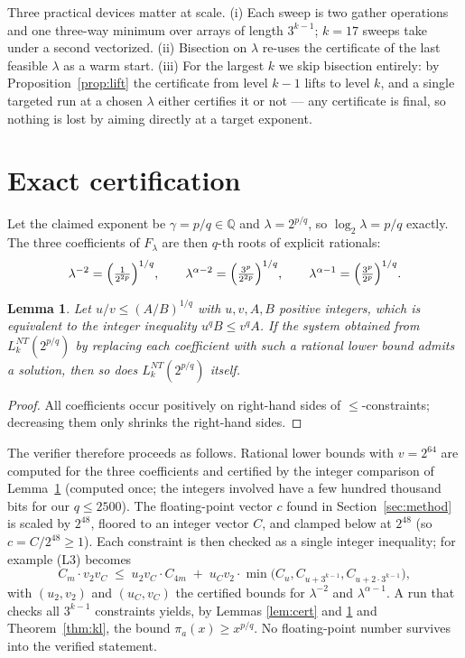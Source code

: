 \documentclass[11pt]{article}
\newtheorem{lemma}[theorem]{Lemma}
\newcommand{\Q}{\mathbb{Q}}
\begin{document}
Three practical devices matter at scale. (i) Each sweep is two gather
operations and one three-way minimum over arrays of length $3^{k-1}$;
$k = 17$ sweeps take under a second vectorized. (ii) Bisection on
$\lambda$ re-uses the certificate of the last feasible $\lambda$ as a
warm start. (iii) For the largest $k$ we skip bisection entirely: by
Proposition~\ref{prop:lift} the certificate from level $k-1$ lifts to
level $k$, and a single targeted run at a chosen $\lambda$ either
certifies it or not --- any certificate is final, so nothing is lost
by aiming directly at a target exponent.

\section{Exact certification}\label{sec:cert}

Let the claimed exponent be $\gamma = p/q \in \Q$ and
$\lambda = 2^{p/q}$, so $\log_2 \lambda = p/q$ exactly. The three
coefficients of $F_\lambda$ are then $q$-th roots of explicit
rationals:
\[
\lambda^{-2} = \Bigl(\tfrac{1}{2^{2p}}\Bigr)^{1/q}, \qquad
\lambda^{\alpha-2} = \Bigl(\tfrac{3^p}{2^{2p}}\Bigr)^{1/q}, \qquad
\lambda^{\alpha-1} = \Bigl(\tfrac{3^p}{2^{p}}\Bigr)^{1/q}.
\]

\begin{lemma}\label{lem:round}
Let $u/v \le (A/B)^{1/q}$ with $u, v, A, B$ positive integers, which
is equivalent to the integer inequality $u^q B \le v^q A$. If the
system obtained from $L_k^{NT}(2^{p/q})$ by replacing each coefficient
with such a rational lower bound admits a solution, then so does
$L_k^{NT}(2^{p/q})$ itself.
\end{lemma}

\begin{proof}
All coefficients occur positively on right-hand sides of
$\le$-constraints; decreasing them only shrinks the right-hand sides.
\end{proof}

The verifier therefore proceeds as follows. Rational lower bounds with
$v = 2^{64}$ are computed for the three coefficients and certified by
the integer comparison of Lemma~\ref{lem:round} (computed once; the
integers involved have a few hundred thousand bits for our $q \le
2500$). The floating-point vector $c$ found in
Section~\ref{sec:method} is scaled by $2^{48}$, floored to an integer
vector $C$, and clamped below at $2^{48}$ (so $c = C/2^{48} \ge 1$).
Each constraint is then checked as a single integer inequality; for
example (L3) becomes
\[
C_m \cdot v_2 v_C \;\le\; u_2 v_C \cdot C_{4m}
 \;+\; u_C v_2 \cdot \min\bigl(C_{u}, C_{u + 3^{k-1}},
 C_{u + 2\cdot 3^{k-1}}\bigr),
\]
with $(u_2, v_2)$ and $(u_C, v_C)$ the certified bounds for
$\lambda^{-2}$ and $\lambda^{\alpha-1}$. A run that checks all
$3^{k-1}$ constraints yields, by Lemmas \ref{lem:cert} and
\ref{lem:round} and Theorem~\ref{thm:kl}, the bound
$\pi_a(x) \ge x^{p/q}$. No floating-point number survives into the
verified statement.
\end{document}
